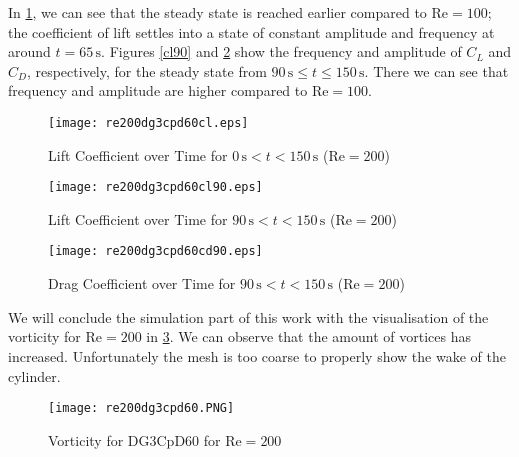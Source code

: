 In \cref{osci200}, we can see that the steady state is reached earlier compared to $\text{Re}=100$; the coefficient of lift settles into a state of constant amplitude and frequency at around $t=65\,\text{s}$. Figures \ref{cl90} and \ref{cdosci200} show the frequency and amplitude of $C_L$ and $C_D$, respectively, for the steady state from $90\,\text{s} \leq t \leq 150\,\text{s}$. There we can see that frequency and amplitude are higher compared to $\text{Re}=100$.
\begin{figure}[htp]	
	\centering
	\texttt{[image: re200dg3cpd60cl.eps]}
	\caption{Lift Coefficient over Time for $0\,\text{s}<t<150\,\text{s}$ ($\text{Re}=200$)}
	\label{osci200}	
\end{figure}
\begin{figure}[htp]	
	\begin{minipage}[b]{0.45\textwidth}
		\centering
		\texttt{[image: re200dg3cpd60cl90.eps]}
		\caption{Lift Coefficient over Time for $90\,\text{s}<t<150\,\text{s}$ ($\text{Re}=200$)}
		\label{cl90}
	\end{minipage}
	\quad
	\begin{minipage}[b]{0.45\textwidth}
		\centering
		\texttt{[image: re200dg3cpd60cd90.eps]}
		\caption{Drag Coefficient over Time for $90\,\text{s}<t<150\,\text{s}$ ($\text{Re}=200$)}
		\label{cdosci200}	
	\end{minipage}
\end{figure}
\newpage
We will conclude the simulation part of this work with the visualisation of the vorticity for $\text{Re}=200$ in \cref{fig:vorticity200}. We can observe that the amount of vortices has increased. Unfortunately the mesh is too coarse to properly show the wake of the cylinder.
\begin{figure}[htp]
	\centering
	\texttt{[image: re200dg3cpd60.PNG]}
	\caption{Vorticity for DG3CpD60 for $\text{Re} = 200$}
	\label{fig:vorticity200}
\end{figure}

